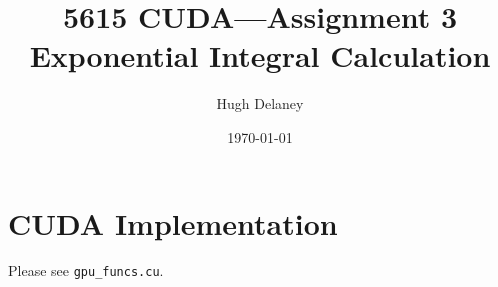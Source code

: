 \documentclass[a4paper, fleqn]{article}
\date{\today}
\author{Hugh Delaney}
\title{5615 CUDA---Assignment 3 \\ Exponential Integral Calculation}
\begin{document}
\maketitle
        \section{CUDA Implementation}%
        \label{sec:cuda_implementation}
        
        Please see \texttt{gpu\_funcs.cu}.
\end{document}
